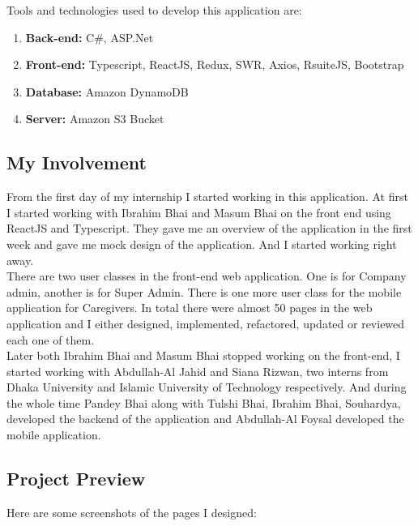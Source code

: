 Tools and technologies used to develop this application are:

\begin{enumerate}
    \item \textbf{Back-end:} C\#, ASP.Net
    \item \textbf{Front-end:} Typescript, ReactJS, Redux, SWR, Axios, RsuiteJS, Bootstrap
    \item \textbf{Database:} Amazon DynamoDB
    \item \textbf{Server:} Amazon S3 Bucket
\end{enumerate}

\subsection{My Involvement}

From the first day of my internship I started working in this application.
At first I started working with Ibrahim Bhai and Masum Bhai on the front end using ReactJS and Typescript.
They gave me an overview of the application in the first week and gave me mock design of the application.
And I started working right away.\\

There are two user classes in the front-end web application.
One is for Company admin, another is for Super Admin.
There is one more user class for the mobile application for Caregivers.
In total there were almost 50 pages in the web application and I either designed, implemented, refactored, updated or reviewed each one of them.\\

Later both Ibrahim Bhai and Masum Bhai stopped working on the front-end, I started working with Abdullah-Al Jahid and Siana Rizwan, two interns from Dhaka University and Islamic University of Technology respectively.
And during the whole time Pandey Bhai along with Tulshi Bhai, Ibrahim Bhai, Souhardya, developed the backend of the application and Abdullah-Al Foysal developed the mobile application.

\subsection{Project Preview}

Here are some screenshots of the pages I designed:

\setlength{\tabcolsep}{4pt}

